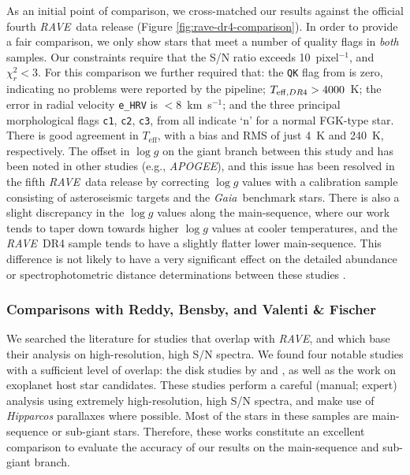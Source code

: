 \documentclass[preprint,trackchanges]{aastex}
\newcommand{\acronym}[1]{{\small{#1}}}
\newcommand{\project}[1]{\textsl{#1}}
\newcommand{\gaia}{\project{Gaia}}
\newcommand{\rave}{\project{\acronym{RAVE}}}
\newcommand{\apogee}{\project{\acronym{APOGEE}}}
\newcommand{\teff}{T_{\mathrm{eff}}}
\newcommand{\logg}{\log g}
\begin{document}
As an initial point of comparison, we cross-matched our results against the 
official fourth \rave\ data release (Figure \ref{fig:rave-dr4-comparison}).
In order to provide a fair comparison, we only show stars that meet a number
of quality flags in \emph{both} samples.  Our constraints require that the
S/N ratio exceeds 10~pixel$^{-1}$, and $\chi_r^2 < 3$.  For this comparison
we further required that:
the \texttt{QK} flag from \citet{Kordopatis_2013} is zero, indicating no
problems were reported by the pipeline; $T_{{\rm eff},DR4} > 4000$~K;
the error in radial velocity \texttt{e\_HRV} is $<$8~km~s$^{-1}$; and the three
principal morphological flags \texttt{c1}, \texttt{c2}, \texttt{c3}, from 
\citet{Matijevic_2012} all indicate `n' for a normal FGK-type star.
There is good agreement in $\teff$, with a bias and RMS of just 4~K and 240~K,
respectively. The offset in $\logg$ on the giant branch between this study and 
\citet{Kordopatis_2013} has been noted in other studies (e.g., \apogee), and this issue
has been resolved in the fifth \rave\ data release by correcting $\logg$
values with a calibration sample consisting of asteroseismic targets and the
\gaia\ benchmark stars.  There is also a
slight discrepancy in the $\logg$ values along the main-sequence, where our
work tends to taper down towards higher $\logg$ values at cooler temperatures,
and the \rave\ DR4 sample tends to have a slightly flatter lower main-sequence.
This difference is not likely to have a very significant effect on the detailed
abundance or spectrophotometric distance determinations between these studies 
\citep{Binney_2014}.


\subsubsection{Comparisons with Reddy, Bensby, and Valenti \& Fischer}
\label{sec:validation-gold-standards}


We searched the literature for studies that overlap with \rave, and which base
their analysis on high-resolution, high S/N spectra.  We found four notable
studies with a sufficient level of overlap: the disk studies by \citet{Reddy_2003,
Reddy_2006} and \citet{Bensby_2014}, as well as the \citet{Valenti_Fischer_2005} 
work on exoplanet host star candidates.  These studies perform a careful (manual;
expert) analysis using extremely high-resolution, high S/N spectra, and make use 
of \project{Hipparcos} parallaxes where possible.  Most of the stars in these 
samples are main-sequence or sub-giant stars.  Therefore, these works constitute 
an excellent comparison to evaluate the accuracy of our results on the 
main-sequence and sub-giant branch.
\end{document}
